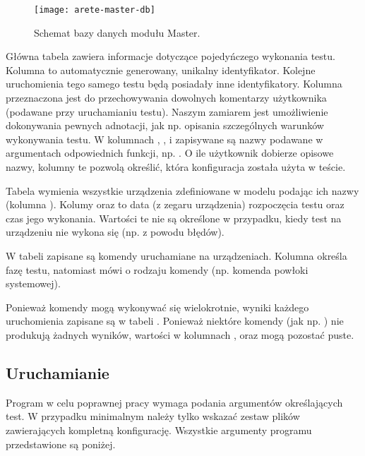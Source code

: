\documentclass[00-praca-magisterska.tex]{subfiles}
\begin{document}
\begin{figure}[htb]
\begin{center}
\leavevmode
\texttt{[image: arete-master-db]}
\end{center}
\caption{Schemat bazy danych modułu Master.}
\label{fig:arete-master-db}
\end{figure}

Główna tabela  zawiera informacje dotyczące pojedyńczego wykonania
testu. Kolumna  to automatycznie generowany, unikalny identyfikator.
Kolejne uruchomienia tego samego testu będą posiadały inne identyfikatory.
Kolumna  przeznaczona jest do przechowywania dowolnych komentarzy
użytkownika (podawane przy uruchamianiu testu). Naszym zamiarem jest
umożliwienie dokonywania pewnych adnotacji, jak np. opisania szczególnych
warunków wykonywania testu. W kolumnach , ,
 i  zapisywane są nazwy podawane w argumentach
odpowiednich funkcji, np. . O ile użytkownik
dobierze opisowe nazwy, kolumny te pozwolą określić, która konfiguracja została
użyta w teście.

Tabela  wymienia wszystkie urządzenia zdefiniowane w modelu podając
ich nazwy (kolumna ). Kolumy  oraz 
to data (z zegaru urządzenia) rozpoczęcia testu oraz czas jego wykonania.
Wartości te nie są określone w przypadku, kiedy test na urządzeniu nie wykona
się (np. z powodu błędów).

W tabeli  zapisane są komendy uruchamiane na urządzeniach.
Kolumna  określa fazę testu, natomiast  mówi o rodzaju
komendy (np. komenda powłoki systemowej).

Ponieważ komendy mogą wykonywać się wielokrotnie, wyniki każdego uruchomienia
zapisane są w tabeli . Ponieważ niektóre komendy (jak np.
) nie produkują żadnych wyników, wartości w kolumnach
,  oraz  mogą pozostać puste.

\subsection{Uruchamianie}

Program  w celu poprawnej pracy wymaga podania argumentów
określających test. W przypadku minimalnym należy tylko wskazać zestaw plików
zawierających kompletną konfigurację. Wszystkie argumenty programu przedstawione
są poniżej.
\end{document}
